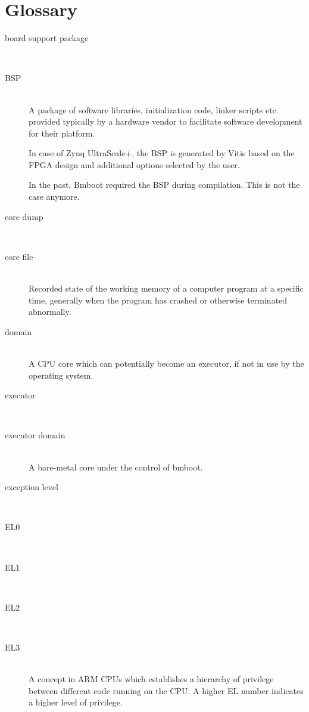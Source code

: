 
\section*{Glossary}

\begin{description}
  \item[board support package] \\
  \item[BSP] \hfill \\ A package of software libraries, initialization code, linker scripts etc. provided typically by a hardware vendor to facilitate software development for their platform.

In case of Zynq UltraScale+, the BSP is generated by Vitis based on the FPGA design and additional options selected by the user.

In the past, Bmboot required the BSP during compilation. This is not the case anymore.

  \item[core dump] \\
  \item[core file] \hfill \\ Recorded state of the working memory of a computer program at a specific time, generally when the program has crashed or otherwise terminated abnormally.

  \item[domain] \hfill \\ A CPU core which can potentially become an executor, if not in use by the operating system.

  \item[executor] \\
  \item[executor domain] \hfill \\ A bare-metal core under the control of bmboot.

  \item[exception level] \\
  \item[EL0] \\
  \item[EL1] \\
  \item[EL2] \\
  \item[EL3] \hfill \\ A concept in ARM CPUs which establishes a hierarchy of privilege between different code running on the CPU.
      A higher EL number indicates a higher level of privilege.


\end{description}
